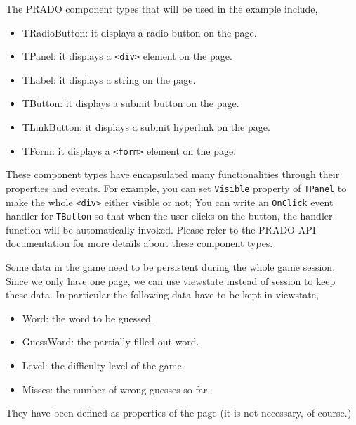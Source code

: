 \documentclass{book}
\begin{document}
The PRADO component types that will be used in the example
include,
\begin{itemize}
\item TRadioButton: it displays a radio button on the page.

\item TPanel: it displays a \verb|<div>| element on the page.

\item TLabel: it displays a string on the page.

\item TButton: it displays a submit button on the page.

\item TLinkButton: it displays a submit hyperlink on the page.

\item TForm: it displays a \verb|<form>| element on the page.
\end{itemize}
These component types have encapsulated many functionalities
through their properties and events. For example, you can set
\verb|Visible| property of \verb|TPanel| to make the whole
\verb|<div>| either visible or not; You can write an
\verb|OnClick| event handler for \verb|TButton| so that when the
user clicks on the button, the handler function will be
automatically invoked. Please refer to the PRADO API documentation
for more details about these component types.


Some data in the game need to be persistent during the whole game
session. Since we only have one page, we can use viewstate instead
of session to keep these data. In particular the following data
have to be kept in viewstate,
\begin{itemize}
\item Word: the word to be guessed.

\item GuessWord: the partially filled out word.

\item Level: the difficulty level of the game.

\item Misses: the number of wrong guesses so far.
\end{itemize}
They have been defined as properties of the page (it is not
necessary, of course.)
\end{document}
